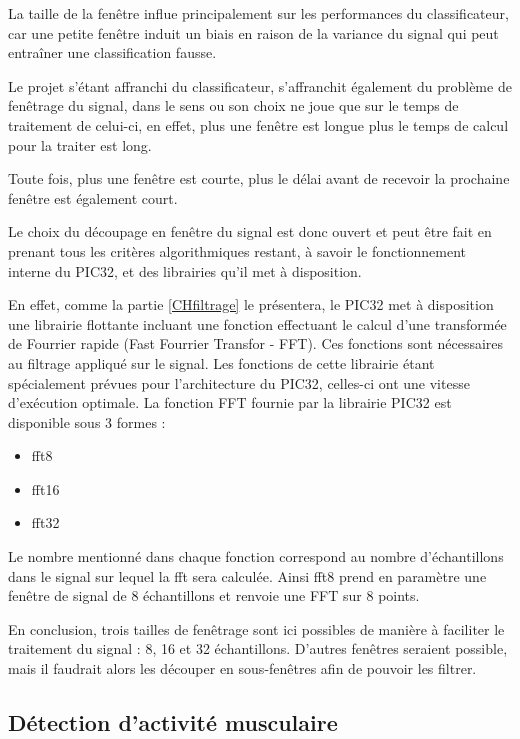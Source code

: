 \documentclass[letterpaper, twoside, 12pt, memoire, creativecommons, hyperref]{thETS}
\begin{document}
La taille de la fenêtre influe principalement sur les performances du classificateur, car une petite fenêtre induit un biais en raison de la variance du signal qui peut entraîner une classification fausse. 

Le projet s'étant affranchi du classificateur, s'affranchit également du problème de fenêtrage du signal, dans le sens ou son choix ne joue que sur le temps de traitement de celui-ci, en effet, plus une fenêtre est longue plus le temps de calcul pour la traiter est long. 

Toute fois, plus une fenêtre est courte, plus le délai avant de recevoir la prochaine fenêtre est également court. 

Le choix du découpage en fenêtre du signal est donc ouvert et peut être fait en prenant tous les critères algorithmiques restant, à savoir le fonctionnement interne du PIC32, et des librairies qu'il met à disposition. 

En effet, comme la partie \ref{CHfiltrage} le présentera, le PIC32 met à disposition une librairie flottante incluant une fonction effectuant le calcul d'une transformée de Fourrier rapide (Fast Fourrier Transfor - FFT). Ces fonctions sont nécessaires au filtrage appliqué sur le signal. Les fonctions de cette librairie étant spécialement prévues pour l'architecture du PIC32, celles-ci ont une vitesse d'exécution optimale. La fonction FFT fournie par la librairie PIC32 est disponible sous 3 formes : 

\begin{itemize}
 \item fft8
 \item fft16
 \item fft32
\end{itemize}

Le nombre mentionné dans chaque fonction correspond au nombre d'échantillons dans le signal sur lequel la fft sera calculée. Ainsi fft8 prend en paramètre une fenêtre de signal de 8 échantillons et renvoie une FFT sur 8 points.

En conclusion, trois tailles de fenêtrage sont ici possibles de manière à faciliter le traitement du signal : 8, 16 et 32 échantillons. D'autres fenêtres seraient possible, mais il faudrait alors les découper en sous-fenêtres afin de pouvoir les filtrer. 

\subsection{Détection d'activité musculaire}\label{CHdetect}
\end{document}
